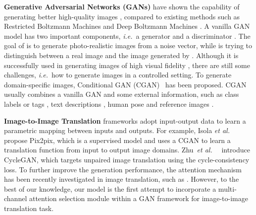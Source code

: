 \documentclass[10pt,twocolumn,letterpaper]{article}
\def\ie{\textit{i.e.}~}
\def\etal{\textit{et al.}~}
\begin{document}
\noindent\textbf{Generative Adversarial Networks (GANs)}
\cite{goodfellow2014generative} have shown the capability of generating better high-quality images \cite{wang2016generative,karras2017progressive,gulrajani2017improved,siarohin2018whitening}, compared to existing methods such as Restricted Boltzmann Machines \cite{hinton2006fast} and Deep Boltzmann Machines \cite{hinton2012better}.
A vanilla GAN model \cite{goodfellow2014generative} has two important components, \ie a generator  and a discriminator .
The goal of  is to generate photo-realistic images from a noise vector, while  is trying to distinguish between a real image and the image generated by .
Although it is successfully used in generating images of high visual fidelity \cite{karras2017progressive,zhang2018self,radford2015unsupervised}, there are still some challenges, \ie how to generate images in a controlled setting. 
To generate domain-specific images, Conditional GAN (CGAN)~\cite{mirza2014conditional} has been proposed.
CGAN usually combines a vanilla GAN and some external information, such as class labels or tags \cite{odena2016semi,odena2016conditional,choi2017stargan,tang2019dual,tang2019attribute}, text descriptions \cite{reed2016learning,han2017stackgan}, human pose \cite{dong2018soft,tang2018gesturegan,neverova2018dense,lakhal2018pose,siarohin2018animating} and reference images \cite{mathieu2015deep,isola2017image}.

\noindent\textbf{Image-to-Image Translation} frameworks adopt input-output data to learn a parametric mapping between inputs and outputs.
For example, Isola \etal \cite{isola2017image} propose Pix2pix, which is a supervised model and uses a CGAN to learn a translation function from input to output image domains.
Zhu~\etal~\cite{zhu2017unpaired} introduce CycleGAN, which targets unpaired image translation using the cycle-consistency loss.
To further improve the generation performance, the attention mechanism has been recently investigated in image translation, such as \cite{chen2018attention,xu2018attngan,tang2019attention,ma2018gan,mejjati2018unsupervised}. However, to the best of our knowledge, our model is the first attempt to incorporate a multi-channel attention selection module within a GAN framework for image-to-image translation task.
\end{document}
